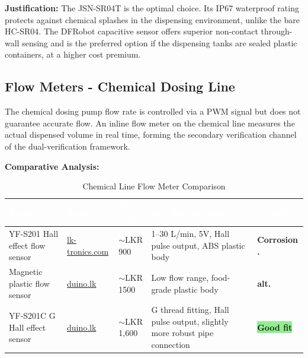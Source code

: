 \documentclass[12pt,a4paper]{article}
\newcommand{\badgegreen}[1]{%
  \colorbox{lightgreen}{\textcolor{badgegreen}{\footnotesize\textbf{#1}}}%
}
\newcommand{\badgeamber}[1]{%
  \colorbox{lightamber}{\textcolor{badgeamber}{\footnotesize\textbf{#1}}}%
}
\begin{document}
\noindent\textbf{Justification:} The JSN-SR04T is the optimal choice. Its IP67 waterproof rating protects against chemical splashes in the dispensing environment, unlike the bare HC-SR04. The DFRobot capacitive sensor offers superior non-contact through-wall sensing and is the preferred option if the dispensing tanks are sealed plastic containers, at a higher cost premium.

\newpage
\subsection{Flow Meters - Chemical Dosing Line}

The chemical dosing pump flow rate is controlled via a PWM signal but does not guarantee accurate flow. An inline flow meter on the chemical line measures the actual dispensed volume in real time, forming the secondary verification channel of the dual-verification framework.

\vspace{0.3cm}
\noindent\textbf{Comparative Analysis:}

\begin{table}[H]
\centering
\setlength{\tabcolsep}{5pt}
\renewcommand{\arraystretch}{1.4}
\begin{tabular}{|p{3.2cm}|p{3.5cm}|p{2.2cm}|p{3.5cm}|p{2cm}|}
\hline
\rowcolor{headerblue}
\textcolor{white}{\textbf{Product}} &
\textcolor{white}{\textbf{Supplier}} &
\textcolor{white}{\textbf{Est. Cost}} &
\textcolor{white}{\textbf{Key Specifications}} &
\textcolor{white}{\textbf{Verdict}} \\
\hline
YF-S201 Hall effect flow sensor &
\href{https://lk-tronics.com/product/yf-s201-water-flow-sensor/}{lk-tronics.com} &
$\sim$LKR 900 &
1--30 L/min, 5V, Hall pulse output, ABS plastic body &
\badgeamber{Corrosion .} \\
\hline
Magnetic plastic flow sensor &
\href{https://www.duino.lk/product/magnetic-plastic-water-flow-sensor/}{duino.lk} &
$\sim$LKR 1500 &
Low flow range, food-grade plastic body &
\badgeamber{alt.} \\
\hline
\rowcolor{chosen}
YF-S201C G\textonehalf{} Hall effect sensor &
\href{https://www.duino.lk/product/yf-s201c-g1-2-hall-effect-liquid-water-flow-sensor/}{duino.lk} &
$\sim$LKR 1,600 &
G\textonehalf{} thread fitting, Hall pulse output, slightly more robust pipe connection &
\badgegreen{Good fit} \\
\hline
\end{tabular}
\caption{Chemical Line Flow Meter Comparison}
\end{table}
\end{document}
